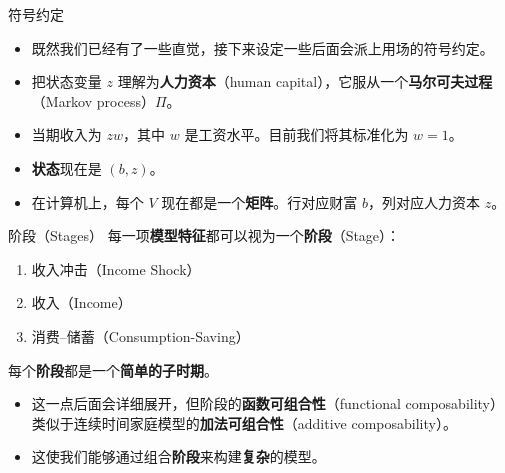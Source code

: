 \documentclass[10pt,aspectratio=169]{beamer}
\begin{document}
\begin{frame}{符号约定}
  \begin{itemize}
    \item 既然我们已经有了一些直觉，接下来设定一些后面会派上用场的符号约定。
    \item 把状态变量 $z$ 理解为\textbf{人力资本}（human capital），它服从一个\textbf{马尔可夫过程}（Markov process）$\Pi$。
    \item 当期收入为 $zw$，其中 $w$ 是工资水平。目前我们将其标准化为 $w = 1$。
    \item \textbf{状态}现在是 $(b, z)$。
    \item 在计算机上，每个 $V$ 现在都是一个\textbf{矩阵}。行对应财富 $b$，列对应人力资本 $z$。
  \end{itemize}
\end{frame}

\begin{frame}{阶段（Stages）}
  每一项\textbf{模型特征}都可以视为一个\textbf{阶段}（Stage）：
  \begin{enumerate}
    \item 收入冲击（Income Shock）
    \item 收入（Income）
    \item 消费--储蓄（Consumption-Saving）
  \end{enumerate}
  每个\textbf{阶段}都是一个\textbf{简单的子时期}。
  \begin{itemize}
    \item 这一点后面会详细展开，但阶段的\textbf{函数可组合性}（functional composability）类似于连续时间家庭模型的\textbf{加法可组合性}（additive composability）。
    \item 这使我们能够通过组合\textbf{阶段}来构建\textbf{复杂}的模型。
  \end{itemize}
\end{frame}
\end{document}
